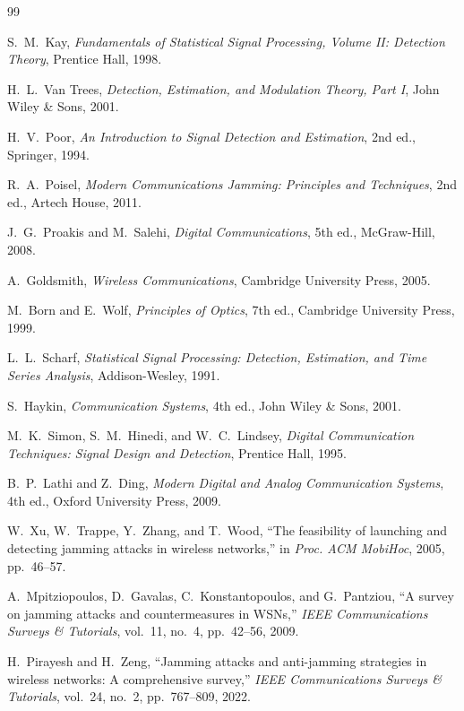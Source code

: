 \documentclass{article}
\begin{document}
\begin{thebibliography}{99}

S.~M.~Kay, \textit{Fundamentals of Statistical Signal Processing, Volume II: Detection Theory}, Prentice Hall, 1998.

H.~L.~Van Trees, \textit{Detection, Estimation, and Modulation Theory, Part I}, John Wiley \& Sons, 2001.

H.~V.~Poor, \textit{An Introduction to Signal Detection and Estimation}, 2nd ed., Springer, 1994.

R.~A.~Poisel, \textit{Modern Communications Jamming: Principles and Techniques}, 2nd ed., Artech House, 2011.

J.~G.~Proakis and M.~Salehi, \textit{Digital Communications}, 5th ed., McGraw-Hill, 2008.

A.~Goldsmith, \textit{Wireless Communications}, Cambridge University Press, 2005.

M.~Born and E.~Wolf, \textit{Principles of Optics}, 7th ed., Cambridge University Press, 1999.

L.~L.~Scharf, \textit{Statistical Signal Processing: Detection, Estimation, and Time Series Analysis}, Addison-Wesley, 1991.

S.~Haykin, \textit{Communication Systems}, 4th ed., John Wiley \& Sons, 2001.

M.~K.~Simon, S.~M.~Hinedi, and W.~C.~Lindsey, \textit{Digital Communication Techniques: Signal Design and Detection}, Prentice Hall, 1995.

B.~P.~Lathi and Z.~Ding, \textit{Modern Digital and Analog Communication Systems}, 4th ed., Oxford University Press, 2009.

W.~Xu, W.~Trappe, Y.~Zhang, and T.~Wood, ``The feasibility of launching and detecting jamming attacks in wireless networks,'' in \textit{Proc. ACM MobiHoc}, 2005, pp.~46--57.

A.~Mpitziopoulos, D.~Gavalas, C.~Konstantopoulos, and G.~Pantziou, ``A survey on jamming attacks and countermeasures in WSNs,'' \textit{IEEE Communications Surveys \& Tutorials}, vol.~11, no.~4, pp.~42--56, 2009.

H.~Pirayesh and H.~Zeng, ``Jamming attacks and anti-jamming strategies in wireless networks: A comprehensive survey,'' \textit{IEEE Communications Surveys \& Tutorials}, vol.~24, no.~2, pp.~767--809, 2022.


\end{thebibliography}
\end{document}
